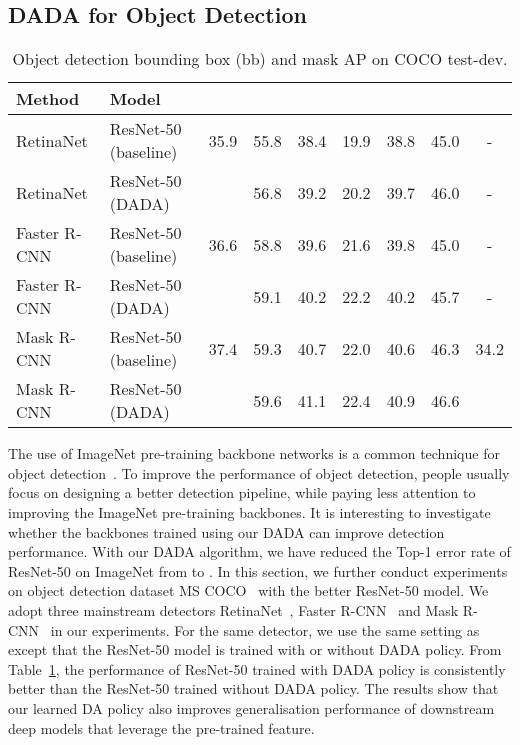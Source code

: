 \documentclass[runningheads]{llncs}
\begin{document}
\subsection{DADA for Object Detection}
\begin{table}[t]
	\centering
	\caption{{Object detection bounding box (bb) and mask AP on COCO test-dev.}}
\begin{tabular}{llccccccc}
		\toprule
		Method & Model &     &  &  &  &  &  & \\
		\midrule
		\midrule
		RetinaNet & ResNet-50 (baseline) & 35.9  & 55.8  & 38.4  & 19.9  & 38.8  & 45.0 & - \\
		RetinaNet & ResNet-50 (DADA) &   & 56.8  & 39.2  & 20.2  & 39.7  & 46.0  & -\\
		\midrule
		Faster R-CNN & ResNet-50 (baseline) & 36.6  & 58.8  & 39.6  & 21.6  & 39.8  & 45.0  & -\\
		Faster R-CNN & ResNet-50 (DADA)  &   & 59.1  & 40.2  & 22.2  & 40.2  & 45.7 & -\\
		\midrule
		Mask R-CNN & ResNet-50 (baseline) & 37.4  & 59.3  & 40.7  & 22.0    & 40.6  & 46.3 & 34.2 \\
		Mask R-CNN & ResNet-50 (DADA) &  & 59.6  & 41.1  & 22.4  & 40.9  & 46.6 & \\
		\bottomrule
	\end{tabular}\label{tab:coco}\end{table}The use of ImageNet pre-training  backbone networks is a common technique for object detection~\cite{DBLP:conf/iccv/LinGGHD17, DBLP:conf/nips/RenHGS15, DBLP:conf/iccv/HeGDG17}.
To improve the performance of object detection, people usually focus on designing a better detection pipeline, while paying less attention to improving the ImageNet pre-training backbones. It is interesting to investigate whether the backbones trained using our DADA can improve detection performance.
With our DADA algorithm, we have reduced the Top-1 error rate of ResNet-50 on ImageNet from  to . 
In this section, we further conduct experiments on object detection dataset MS COCO~\cite{DBLP:conf/eccv/LinMBHPRDZ14} with the better ResNet-50 model.
We adopt three mainstream detectors RetinaNet~\cite{DBLP:conf/iccv/LinGGHD17}, Faster R-CNN~\cite{DBLP:conf/nips/RenHGS15} and Mask R-CNN~\cite{DBLP:conf/iccv/HeGDG17} in our experiments.
For the same detector, we use the same setting as~\cite{DBLP:journals/corr/abs-1906-07155} except that the ResNet-50 model is trained with or without DADA policy.
From Table~\ref{tab:coco}, the performance of ResNet-50 trained with DADA policy is consistently
better than the ResNet-50 trained without DADA policy.
The results show that our learned DA policy also improves generalisation performance of downstream deep models that leverage the pre-trained feature.
\end{document}
